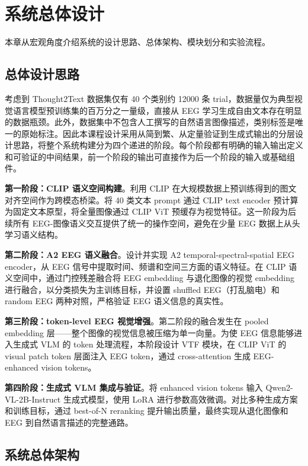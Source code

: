 \section{系统总体设计}

本章从宏观角度介绍系统的设计思路、总体架构、模块划分和实验流程。

\subsection{总体设计思路}

考虑到 Thought2Text 数据集仅有 40 个类别约 12000 条 trial，数据量仅为典型视觉语言模型预训练集的百万分之一量级，直接从 EEG 学习生成自由文本存在明显的数据瓶颈。此外，数据集中不包含人工撰写的自然语言图像描述，类别标签是唯一的原始标注。因此本课程设计采用从简到繁、从定量验证到生成式输出的分层设计思路，将整个系统构建分为四个递进的阶段。每个阶段都有明确的输入输出定义和可验证的中间结果，前一个阶段的输出可直接作为后一个阶段的输入或基础组件。

\textbf{第一阶段：CLIP 语义空间构建}。利用 CLIP 在大规模数据上预训练得到的图文对齐空间作为跨模态桥梁。将 40 类文本 prompt 通过 CLIP text encoder 预计算为固定文本原型，将全量图像通过 CLIP ViT 预缓存为视觉特征。这一阶段为后续所有 EEG-图像语义交互提供了统一的操作空间，避免在少量 EEG 数据上从头学习语义结构。

\textbf{第二阶段：A2 EEG 语义融合}。设计并实现 A2 temporal-spectral-spatial EEG encoder，从 EEG 信号中提取时间、频谱和空间三方面的语义特征。在 CLIP 语义空间中，通过门控残差融合将 EEG embedding 与退化图像的视觉 embedding 进行融合，以分类损失为主训练目标，并设置 shuffled EEG（打乱脑电）和 random EEG 两种对照，严格验证 EEG 语义信息的真实性。

\textbf{第三阶段：token-level EEG 视觉增强}。第二阶段的融合发生在 pooled embedding 层——整个图像的视觉信息被压缩为单一向量。为使 EEG 信息能够进入生成式 VLM 的 token 处理流程，本阶段设计 VTF 模块，在 CLIP ViT 的 visual patch token 层面注入 EEG token，通过 cross-attention 生成 EEG-enhanced vision tokens。

\textbf{第四阶段：生成式 VLM 集成与验证}。将 enhanced vision tokens 输入 Qwen2-VL-2B-Instruct 生成式模型，使用 LoRA 进行参数高效微调。对比多种生成方案和训练目标，通过 best-of-N reranking 提升输出质量，最终实现从退化图像和 EEG 到自然语言描述的完整通路。

\subsection{系统总体架构}

